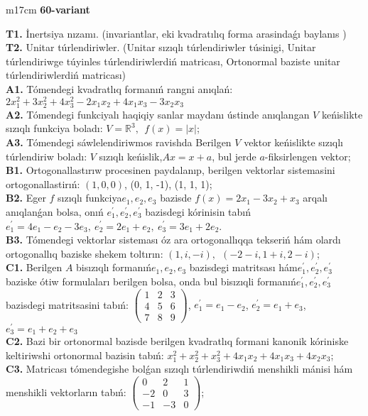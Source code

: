 \documentclass{article}
\begin{document}
\begin{tabular}{m{17cm}}
\textbf{60-variant}
\newline

\textbf{T1.} İnertsiya nızamı. (invariantlar,  eki kvadratılıq forma arasindaǵı baylanıs ) \\
\textbf{T2.} Unitar túrlendiriwler. (Unitar sızıqlı túrlendiriwler túsinigi,  Unitar túrlendiriwge túyinles túrlendiriwlerdiń matricası,   Ortonormal baziste unitar túrlendiriwlerdiń matricası) \\
\textbf{A1.} Tómendegi kvadratlıq formanıń rangni anıqlań: \(2x_{1}^{2} + 3x_{2}^{2} + 4x_{3}^{2} - 2x_{1}x_{2} + 4x_{1}x_{3} - 3x_{2}x_{3}\) \\
\textbf{A2.} Tómendegi funkciyalı haqiqiy sanlar maydanı ústinde anıqlangan \(V\) keńislikte sızıqlı funkciya boladı: \(V = \mathbb{R}^{3},\ \ f(x) = |x|\); \\
\textbf{A3.} Tómendegi sáwlelendiriwmos ravishda Berilgen \(V\) vektor keńislikte sızıqlı túrlendiriw boladı: \(V\) sızıqlı keńislik,\(Ax = x + a\), bul jerde \(a\)-fiksirlengen vektor; \\
\textbf{B1.} Ortogonallastırıw procesinen paydalanıp, berilgen vektorlar sistemasini ortogonallastirıń: \((1,0,0)\), (0, 1, -1), (1, 1, 1); \\
\textbf{B2.} Eger \(f\) sızıqlı funkciya\(e_{1},e_{2},e_{3}\) bazisde \(f(x) = 2x_{1} - 3x_{2} + x_{3}\) arqalı anıqlanǵan bolsa, onıń \(e_{1}^{'},e_{2}^{'},e_{3}^{'}\) bazisdegi kórinisin tabıń\(e_{1}^{'} = 4e_{1} - e_{2} - 3e_{3},\ e_{2}^{'} = 2e_{1} + e_{2},\ e_{3}^{'} = 3e_{1} + 2e_{2}\). \\
\textbf{B3.} Tómendegi vektorlar sisteması óz ara ortogonallıqqa tekseriń hám olardı ortogonallıq baziske shekem toltırın: \((1,i, - i),\ \ ( - 2 - i,1 + i,2 - i)\); \\
\textbf{C1.} Berilgen \(A\) bisızıqlı formanıń\(e_{1},e_{2},e_{3}\) bazisdegi matritsası hám\(e_{1}^{'},e_{2}^{'},e_{3}^{'}\) baziske ótiw formulaları berilgen bolsa, onda bul bisızıqli formanıń\(e_{1}^{'},e_{2}^{'},e_{3}^{'}\) bazisdegi matritsasini tabıń: \(\begin{pmatrix} 1 & 2 & 3 \\ 4 & 5 & 6 \\ 7 & 8 & 9 \end{pmatrix}\), \(e_{1}^{'} = e_{1} - e_{2}\), \(e_{2}^{'} = e_{1} + e_{3}\), \(e_{3}^{'} = e_{1} + e_{2} + e_{3}\) \\
\textbf{C2.} Bazi bir ortonormal bazisde berilgen kvadratlıq formani kanonik kóriniske keltiriwshi ortonormal bazisin tabıń: \(x_{1}^{2} + x_{2}^{2} + x_{3}^{2} + 4x_{1}x_{2} + 4x_{1}x_{3} + 4x_{2}x_{3}\); \\
\textbf{C3.} Matricası tómendegishe bolǵan sızıqlı túrlendiriwdiń menshikli mánisi hám menshikli vektorların tabıń: \(\begin{pmatrix} 0 & 2 & 1 \\  - 2 & 0 & 3 \\  - 1 & - 3 & 0 \end{pmatrix}\); \\

\end{tabular}
\vspace{1cm}
\end{document}
